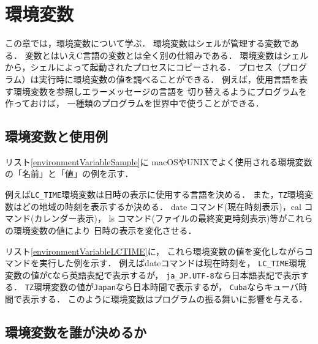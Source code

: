 \chapter{環境変数}
この章では，環境変数について学ぶ．
環境変数はシェルが管理する変数である．
変数とはいえC言語の変数とは全く別の仕組みである．
環境変数はシェルから，シェルによって起動されたプロセスにコピーされる．
プロセス（プログラム）は実行時に環境変数の値を調べることができる．
例えば，使用言語を表す環境変数を参照しエラーメッセージの言語を
切り替えるようにプログラムを作っておけば，
一種類のプログラムを世界中で使うことができる．

\section{環境変数と使用例}
リスト\ref{environmentVariableSample}に
macOSやUNIXでよく使用される環境変数の「名前」と「値」の例を示す．



例えば\texttt{LC\_TIME}環境変数は日時の表示に使用する言語を決める．
また，\texttt{TZ}環境変数はどの地域の時刻を表示するか決める．
date コマンド(現在時刻表示)，cal コマンド(カレンダー表示)，
ls コマンド(ファイルの最終変更時刻表示)等がこれらの環境変数の値により
日時の表示を変化させる．

リスト\ref{environmentVariableLCTIME}に，
これら環境変数の値を変化しながらコマンドを実行した例を示す．
例えばdateコマンドは現在時刻を，
\texttt{LC\_TIME}環境変数の値が\texttt{C}なら英語表記で表示するが，
\texttt{ja\_JP.UTF-8}なら日本語表記で表示する．
\texttt{TZ}環境変数の値が\texttt{Japan}なら日本時間で表示するが，
\texttt{Cuba}ならキューバ時間で表示する．
このように環境変数はプログラムの振る舞いに影響を与える．



\section{環境変数を誰が決めるか}

